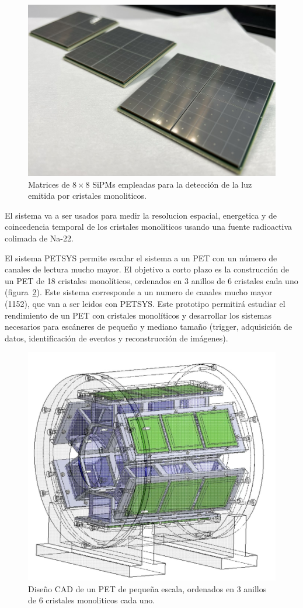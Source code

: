 \documentclass[12pt,a4paper,article]{report} %
\begin{document}
\begin{figure}[ht!]
  \begin{center}
  \includegraphics[width=0.5\linewidth]{img/sipm_matrix.jpg}
  \caption{Matrices de $8\times8$ SiPMs empleadas para la detección de la luz emitida por cristales monoliticos.}\label{fig:matrices}
  \end{center}
  \end{figure}

El sistema va a ser usados para medir la resolucion espacial, energetica y de coincedencia temporal de los cristales monoliticos usando una fuente radioactiva colimada de Na-22.

El sistema PETSYS permite escalar el sistema a un PET con un número de canales de lectura mucho mayor. El objetivo a corto plazo es la construcción de un PET de 18 cristales monolíticos, ordenados en 3 anillos de 6 cristales cada uno (figura~\ref{fig:small_animal}). Este sistema corresponde a un numero de canales mucho mayor (1152), que van a ser leidos con PETSYS. Este prototipo permitirá estudiar el rendimiento de un PET con cristales monolíticos y desarrollar los sistemas necesarios para escáneres de pequeño y mediano tamaño (trigger, adquisición de datos, identificación de eventos y reconstrucción de imágenes).

\begin{figure}[ht!]
  \begin{center}
  \includegraphics[width=0.5\linewidth]{img/small_animal.jpg}
  \caption{Diseño CAD de un PET de pequeña escala, ordenados en 3 anillos de 6 cristales monoliticos cada uno.}\label{fig:small_animal}
  \end{center}
  \end{figure}
\end{document}
